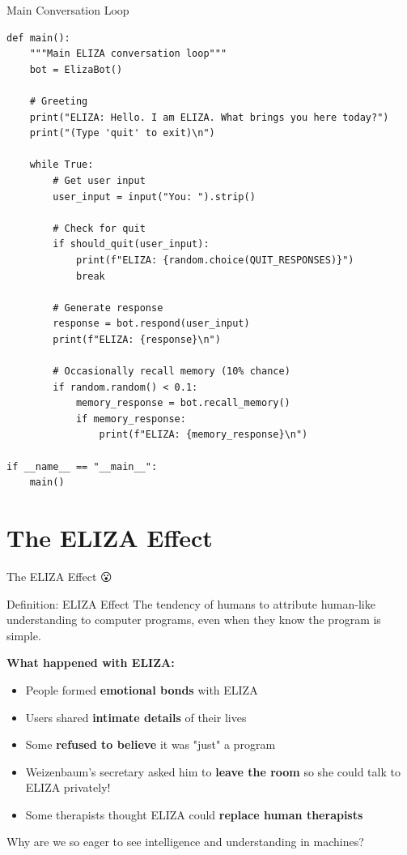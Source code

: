 \documentclass[aspectratio=169]{beamer}
\begin{document}
\begin{frame}[fragile]{Main Conversation Loop 🔁}
\begin{lstlisting}[basicstyle=\ttfamily\tiny]
def main():
    """Main ELIZA conversation loop"""
    bot = ElizaBot()

    # Greeting
    print("ELIZA: Hello. I am ELIZA. What brings you here today?")
    print("(Type 'quit' to exit)\n")

    while True:
        # Get user input
        user_input = input("You: ").strip()

        # Check for quit
        if should_quit(user_input):
            print(f"ELIZA: {random.choice(QUIT_RESPONSES)}")
            break

        # Generate response
        response = bot.respond(user_input)
        print(f"ELIZA: {response}\n")

        # Occasionally recall memory (10% chance)
        if random.random() < 0.1:
            memory_response = bot.recall_memory()
            if memory_response:
                print(f"ELIZA: {memory_response}\n")

if __name__ == "__main__":
    main()
\end{lstlisting}
\end{frame}

\section{The ELIZA Effect}

\begin{frame}{The ELIZA Effect 😮}
\small
\begin{block}{Definition: ELIZA Effect}
The tendency of humans to attribute human-like understanding to computer programs, even when they know the program is simple.
\end{block}

\vspace{0.3cm}

\textbf{What happened with ELIZA:}
\begin{itemize}\setlength{\itemsep}{0pt}
    \item People formed \textbf{emotional bonds} with ELIZA
    \item Users shared \textbf{intimate details} of their lives
    \item Some \textbf{refused to believe} it was "just" a program
    \item Weizenbaum's secretary asked him to \textbf{leave the room} so she could talk to ELIZA privately!
    \item Some therapists thought ELIZA could \textbf{replace human therapists}
\end{itemize}

\vspace{0.3cm}

\begin{thinkaboutit}
Why are we so eager to see intelligence and understanding in machines?
\end{thinkaboutit}
\end{frame}
\end{document}
